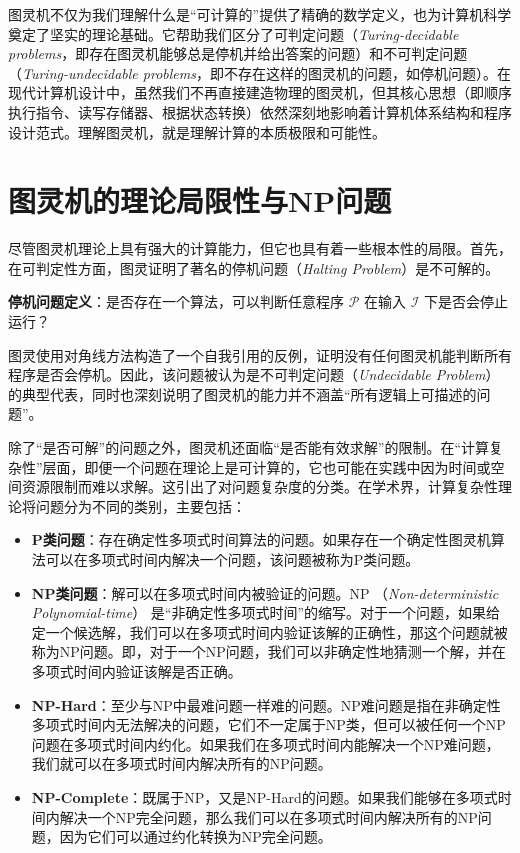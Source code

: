 \documentclass[UTF8,openany,zihao=5]{ctexbook}
\begin{document}
图灵机不仅为我们理解什么是“可计算的”提供了精确的数学定义，也为计算机科学奠定了坚实的理论基础。它帮助我们区分了可判定问题（\textit{Turing-decidable problems}，即存在图灵机能够总是停机并给出答案的问题）和不可判定问题（\textit{Turing-undecidable problems}，即不存在这样的图灵机的问题，如停机问题）。在现代计算机设计中，虽然我们不再直接建造物理的图灵机，但其核心思想（即顺序执行指令、读写存储器、根据状态转换）依然深刻地影响着计算机体系结构和程序设计范式。理解图灵机，就是理解计算的本质极限和可能性。

\section{图灵机的理论局限性与NP问题}

尽管图灵机理论上具有强大的计算能力，但它也具有着一些根本性的局限。首先，在可判定性方面，图灵证明了著名的停机问题（\textit{Halting Problem}）是不可解的。

\textbf{停机问题定义}：是否存在一个算法，可以判断任意程序 $\mathcal{P}$ 在输入 $\mathcal{I}$ 下是否会停止运行？

图灵使用对角线方法构造了一个自我引用的反例，证明没有任何图灵机能判断所有程序是否会停机\cite{turing1936computable}。因此，该问题被认为是不可判定问题（\textit{Undecidable Problem}）的典型代表，同时也深刻说明了图灵机的能力并不涵盖“所有逻辑上可描述的问题”。

除了“是否可解”的问题之外，图灵机还面临“是否能有效求解”的限制。在“计算复杂性”层面，即便一个问题在理论上是可计算的，它也可能在实践中因为时间或空间资源限制而难以求解。这引出了对问题复杂度的分类。在学术界，计算复杂性理论将问题分为不同的类别，主要包括：

\begin{itemize}[noitemsep]
    \item \textbf{P类问题}：存在确定性多项式时间算法的问题。如果存在一个确定性图灵机算法可以在多项式时间内解决一个问题，该问题被称为P类问题。
    \item \textbf{NP类问题}：解可以在多项式时间内被验证的问题。NP （\textit{Non-deterministic Polynomial-time}） 是“非确定性多项式时间”的缩写。对于一个问题，如果给定一个候选解，我们可以在多项式时间内验证该解的正确性，那这个问题就被称为NP问题。即，对于一个NP问题，我们可以非确定性地猜测一个解，并在多项式时间内验证该解是否正确。
    \item \textbf{NP-Hard}：至少与NP中最难问题一样难的问题。NP难问题是指在非确定性多项式时间内无法解决的问题，它们不一定属于NP类，但可以被任何一个NP问题在多项式时间内约化。如果我们在多项式时间内能解决一个NP难问题，我们就可以在多项式时间内解决所有的NP问题。
    \item \textbf{NP-Complete}：既属于NP，又是NP-Hard的问题。如果我们能够在多项式时间内解决一个NP完全问题，那么我们可以在多项式时间内解决所有的NP问题，因为它们可以通过约化转换为NP完全问题。
\end{itemize}
\end{document}
